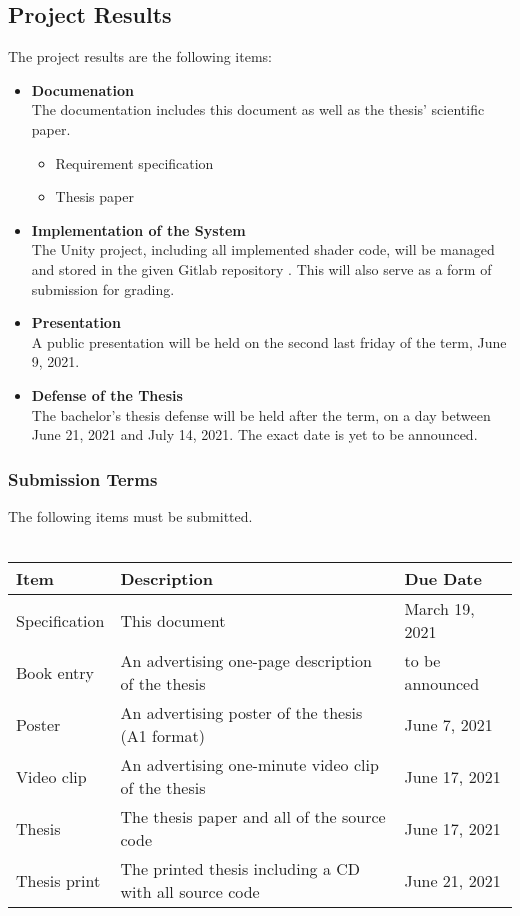 \subsection{Project Results}
The project results are the following items:
\begin{itemize}
    \item \textbf{Documenation} \\
    The documentation includes this document as well as the thesis' scientific paper.
    \begin{itemize}
        \item Requirement specification
        \item Thesis paper
    \end{itemize}
    \item \textbf{Implementation of the System} \\
    The Unity project, including all implemented shader code, will be managed and stored in the given Gitlab repository \cite{gitlab}. This will also serve as a form of submission for grading.
    \item \textbf{Presentation} \\
    A public presentation will be held on the second last friday of the term, June 9, 2021.
    \item \textbf{Defense of the Thesis} \\
    The bachelor's thesis defense will be held after the term, on a day between June 21, 2021 and July 14, 2021. The exact date is yet to be announced. 
\end{itemize}

\subsubsection{Submission Terms}
The following items must be submitted.
\\\\
\noindent
\begin{tabular}{|l|l|l|}
    \hline
    \textbf{Item}    & \textbf{Description}                                      & \textbf{Due Date}     \\ \hline
    Specification    & This document                                             & March 19, 2021      \\ \hline
    Book entry       & An advertising one-page description of the thesis         & to be announced       \\ \hline
    Poster           & An advertising poster of the thesis (A1 format)           & June 7, 2021        \\ \hline
    Video clip       & An advertising one-minute video clip of the thesis        & June 17, 2021       \\ \hline
    Thesis           & The thesis paper and all of the source code               & June 17, 2021       \\ \hline
    Thesis print     & The printed thesis including a CD with all source code    & June 21, 2021       \\ \hline
\end{tabular}
\newline
\noindent